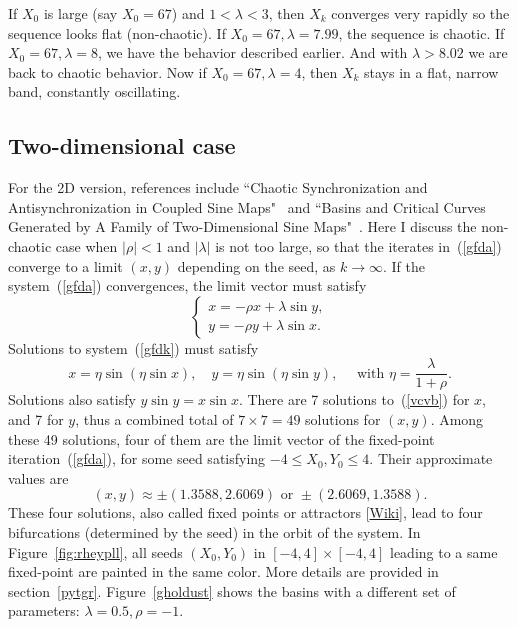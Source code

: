 \documentclass[oneside,10pt]{book}
\begin{document}
If $X_0$ is large (say $X_0=67$) and $1<\lambda<3$, then $X_k$ converges very rapidly so the sequence looks flat (non-chaotic). If $X_0=67,\lambda=7.99$, the sequence is chaotic.
If $X_0=67,\lambda=8$, we have the behavior described earlier. And with
$\lambda>8.02$ we are back to chaotic behavior.
Now if $X_0=67,\lambda=4$, then $X_k$ stays in a flat, narrow band, constantly oscillating.


\subsection{Two-dimensional case}\label{sinere23jh}

For the 2D version, references include
``Chaotic Synchronization and Antisynchronization in Coupled Sine Maps"~\cite{mama221} and
``Basins and Critical Curves Generated by A Family of Two-Dimensional Sine Maps"~\cite{mavcx2}.
Here I discuss the non-chaotic case when $|\rho|<1$ and $|\lambda|$ is not too large, so that the
 iterates in~(\ref{gfda}) converge to a limit $(x,y)$ depending on the seed, as $k\rightarrow\infty$.
 If the system~(\ref{gfda}) convergences, the limit vector must satisfy
\begin{equation}
    \begin{cases}
      x = -\rho x + \lambda \sin y, \\[3pt]
     y = -\rho y + \lambda \sin x. \label{gfdk}
    \end{cases} %
\end{equation}
Solutions to system~(\ref{gfdk}) must satisfy
\begin{equation}
 x=\eta\sin(\eta\sin x),\quad y=\eta\sin(\eta\sin y),  \quad\text{ with } \eta = \frac{\lambda}{1+\rho}. \label{vcvb}
\end{equation}
Solutions also satisfy $y\sin y = x\sin x$.
There are 7 solutions to~(\ref{vcvb}) for $x$, and 7 for $y$, thus a combined total of $7\times 7 = 49$ solutions for $(x,y)$. Among
 these 49 solutions, four of them are the limit vector of the fixed-point iteration~(\ref{gfda}), for some seed
  satisfying $-4\leq X_0,Y_0\leq 4$. Their  approximate values are
$$
(x, y)\approx \pm (1.3588, 2.6069) \text{ or }
\pm(2.6069, 1.3588).
$$
These four solutions, also called \textcolor{index}{fixed points} or \textcolor{index}{attractors} [\href{https://en.wikipedia.org/wiki/Attractor}{Wiki}],
 lead to four \textcolor{index}{bifurcations} (determined by the seed) in the orbit of the system.
In Figure~\ref{fig:rheypll}, all seeds $(X_0,Y_0)$ in $ [-4,4]\times [-4, 4]$ leading to a same fixed-point are painted in the same color.
More details are provided in section~\ref{pytgr}. Figure~\ref{gholdust} shows the basins with
 a different set of parameters: $\lambda=0.5,\rho=-1$.
\end{document}
